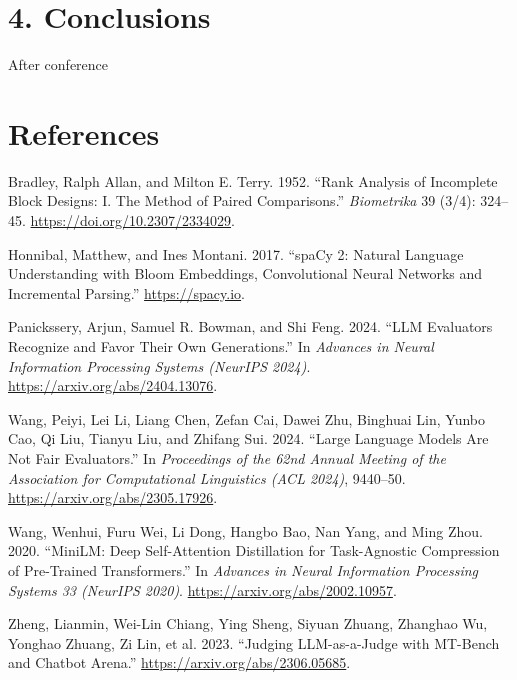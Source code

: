 \documentclass[
  10pt,
]{article}
\newlength{\cslhangindent}
\newenvironment{CSLReferences}[2] %
 {\begin{list}{}{%
  \setlength{\itemindent}{0pt}
  \setlength{\leftmargin}{0pt}
  \setlength{\parsep}{0pt}
  \ifodd #1
   \setlength{\leftmargin}{\cslhangindent}
   \setlength{\itemindent}{-1\cslhangindent}
  \fi
  \setlength{\itemsep}{#2\baselineskip}}}
 {\end{list}}
\begin{document}
\section{4. Conclusions}\label{conclusions}

After conference

\section{References}\label{references}

\protect{}\label{refs}
\begin{CSLReferences}{1}{0}
Bradley, Ralph Allan, and Milton E. Terry. 1952. {``Rank Analysis of
Incomplete Block Designs: I. The Method of Paired Comparisons.''}
\emph{Biometrika} 39 (3/4): 324--45.
\url{https://doi.org/10.2307/2334029}.

Honnibal, Matthew, and Ines Montani. 2017. {``spaCy 2: Natural Language
Understanding with Bloom Embeddings, Convolutional Neural Networks and
Incremental Parsing.''} \url{https://spacy.io}.

Panickssery, Arjun, Samuel R. Bowman, and Shi Feng. 2024. {``LLM
Evaluators Recognize and Favor Their Own Generations.''} In
\emph{Advances in Neural Information Processing Systems (NeurIPS 2024)}.
\url{https://arxiv.org/abs/2404.13076}.

Wang, Peiyi, Lei Li, Liang Chen, Zefan Cai, Dawei Zhu, Binghuai Lin,
Yunbo Cao, Qi Liu, Tianyu Liu, and Zhifang Sui. 2024. {``Large Language
Models Are Not Fair Evaluators.''} In \emph{Proceedings of the 62nd
Annual Meeting of the Association for Computational Linguistics (ACL
2024)}, 9440--50. \url{https://arxiv.org/abs/2305.17926}.

Wang, Wenhui, Furu Wei, Li Dong, Hangbo Bao, Nan Yang, and Ming Zhou.
2020. {``MiniLM: Deep Self-Attention Distillation for Task-Agnostic
Compression of Pre-Trained Transformers.''} In \emph{Advances in Neural
Information Processing Systems 33 (NeurIPS 2020)}.
\url{https://arxiv.org/abs/2002.10957}.

Zheng, Lianmin, Wei-Lin Chiang, Ying Sheng, Siyuan Zhuang, Zhanghao Wu,
Yonghao Zhuang, Zi Lin, et al. 2023. {``Judging LLM-as-a-Judge with
MT-Bench and Chatbot Arena.''} \url{https://arxiv.org/abs/2306.05685}.

\end{CSLReferences}
\end{document}
